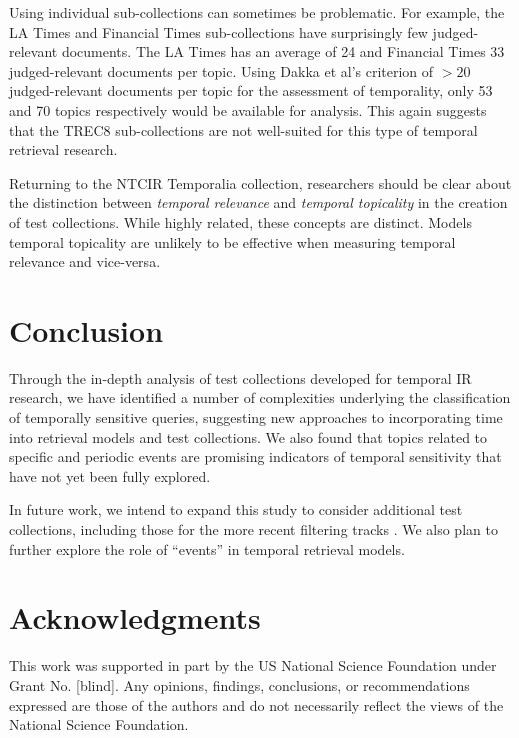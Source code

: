 \documentclass{asist}
\begin{document}
Using individual sub-collections can sometimes be problematic. For example,  the LA Times and Financial Times sub-collections have surprisingly few judged-relevant documents. The LA Times has an average of 24 and Financial Times 33 judged-relevant documents per topic.  Using Dakka et al's \cite{Dakka2012} criterion of $>20$ judged-relevant documents per topic for the assessment of temporality, only 53 and 70 topics respectively would be available for analysis. This again suggests that the TREC8 sub-collections are not well-suited for this type of temporal retrieval research.

Returning to the NTCIR Temporalia collection, researchers should be clear about the distinction between \emph{temporal relevance} and \emph{temporal topicality} in the creation of test collections. While highly related, these concepts are distinct. Models temporal topicality are unlikely to be effective when measuring temporal relevance and vice-versa.

\section{Conclusion}

Through the in-depth analysis of test collections developed for temporal IR research, we have identified a number of complexities underlying the classification of temporally sensitive queries, suggesting new approaches to incorporating time into retrieval models and test collections. We also found that topics related to specific and periodic events are promising indicators of temporal sensitivity that have not yet been fully explored.  

In future work, we intend to expand this study to consider additional test collections, including those for the more recent filtering tracks \cite{Frank2013, Guo2013}. We also plan to further explore the role of ``events'' in temporal retrieval models.

\section{Acknowledgments}
This work was supported in part by the US National Science Foundation under Grant No. [blind]. Any opinions, findings, conclusions, or recommendations expressed are those of the authors and do not necessarily reflect the views of the National Science Foundation. 

%

  
\end{document}
